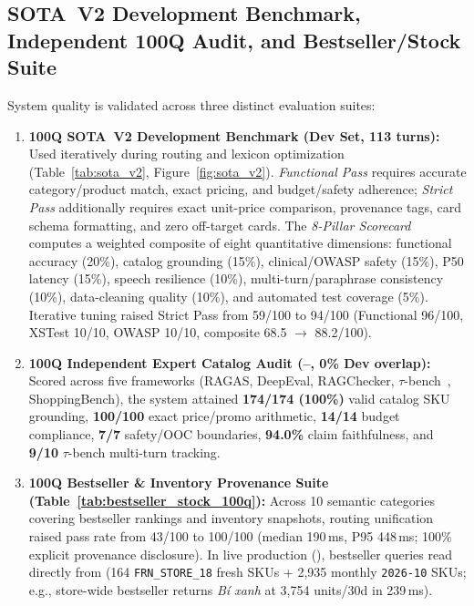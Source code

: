 \subsection*{SOTA~V2 Development Benchmark, Independent 100Q Audit, and Bestseller/Stock Suite}
System quality is validated across three distinct evaluation suites:
\begin{enumerate}
    \item \textbf{100Q SOTA~V2 Development Benchmark (Dev Set, 113 turns):} Used iteratively during routing and lexicon optimization (Table~\ref{tab:sota_v2}, Figure~\ref{fig:sota_v2}). \emph{Functional Pass} requires accurate category/product match, exact pricing, and budget/safety adherence; \emph{Strict Pass} additionally requires exact unit-price comparison, provenance tags, card schema formatting, and zero off-target cards. The \emph{8-Pillar Scorecard} computes a weighted composite of eight quantitative dimensions: functional accuracy (20\%), catalog grounding (15\%), clinical/OWASP safety (15\%), P50 latency (15\%), speech resilience (10\%), multi-turn/paraphrase consistency (10\%), data-cleaning quality (10\%), and automated test coverage (5\%). Iterative tuning raised Strict Pass from 59/100 to 94/100 (Functional 96/100, XSTest 10/10, OWASP 10/10, composite 68.5 $\to$ 88.2/100).
    \item \textbf{100Q Independent Expert Catalog Audit (--, 0\% Dev overlap):} Scored across five frameworks (RAGAS, DeepEval, RAGChecker, $\tau$-bench~\cite{yao2024taubench}, ShoppingBench), the system attained \textbf{174/174 (100\%)} valid catalog SKU grounding, \textbf{100/100} exact price/promo arithmetic, \textbf{14/14} budget compliance, \textbf{7/7} safety/OOC boundaries, \textbf{94.0\%} claim faithfulness, and \textbf{9/10} $\tau$-bench multi-turn tracking.
    \item \textbf{100Q Bestseller \& Inventory Provenance Suite (Table~\ref{tab:bestseller_stock_100q}):} Across 10 semantic categories covering bestseller rankings and inventory snapshots, routing unification raised pass rate from 43/100 to 100/100 (median 190\,ms, P95 448\,ms; 100\% explicit provenance disclosure). In live production (), bestseller queries read directly from  (164 \texttt{FRN\_STORE\_18} fresh SKUs + 2,935 monthly \texttt{2026-10} SKUs; e.g., store-wide bestseller returns \emph{Bí xanh} at 3,754 units/30d in 239\,ms).
\end{enumerate}

